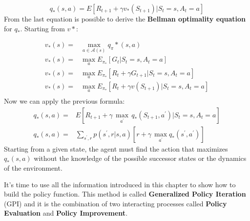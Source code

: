 \begin{equation}
\label{bellman-equation-for-q}
q_*(s,a) = E \left [  R_{t+1} + \gamma v_*(S_{t+1}) | S_t = s, A_t = a \right]
\end{equation}
From the last equation is possible to derive the \textbf{Bellman optimality equation} for $q_*$.
Starting from $v*$:

\begin{align*}
v_*(s) =&  \underset{a\in \mathcal{A}(s)}{\max}q_\pi*(s,a)\\
v_*(s) =& \underset{a}{\max} E_{\pi_*} \left[  G_t | S_t = s, A_t = a \right]\\
v_*(s) =& \underset{a}{\max} E_{\pi_*} \left[ R_{t} + \gamma G_{t+1} | S_t = s, A_t = a \right]\\
v_*(s) =& \underset{a}{\max} E_{\pi_*} \left[ R_{t} + \gamma v
(S_{t+1}) | S_t = s, A_t = a \right]\\
\end{align*}
Now we can apply the previous formula:
\begin{align} \label{q_star}
q_*(s,a) =& E \left[ R_{t+1} + \gamma \, \underset{a^{'}}{\max} \, q_* (S_{t+1}, a^{'}) | S_t = s, A_t = a   \right] \\
q_*(s,a) =& \sum_{s^{'},r}p(s^{'},r|s,a)\left[ r + \gamma \, \underset{a^{'}}{\max} q_*(s^{'},a^{'})\right]
\end{align}
Starting from a given state, the agent must find the action that maximizes $ q _ * (s, a) $ without the knowledge of the possible successor states or the dynamics of the environment.

It's time to use all the information introduced in this chapter to show how to build the policy function.
This method is called \textbf{Generalized Policy Iteration} (GPI) and it is the combination of two interacting processes called \textbf{Policy Evaluation} and \textbf{Policy Improvement}.

